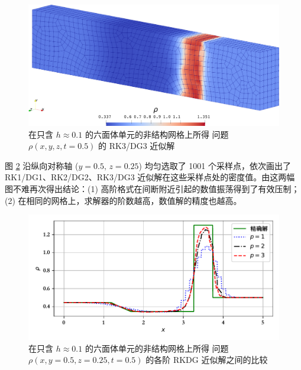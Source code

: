 \begin{figure}[h!]
\begin{centering}
\includegraphics[width=1\textwidth]{../mdpi/figures/shock_tubes/lax/contour}
\par\end{centering}
\caption{\label{fig:lax_hexa}在只含 $h\approx0.1$ 的六面体单元的非结构网格上所得 问题
$\rho(x,y,z,t=0.5)$ 的 RK3/DG3 近似解}
\end{figure}

图 \ref{fig:lax_hexa_p_vary} 沿纵向对称轴 ($y=0.5,\,z=0.25$) 均匀选取了 1001
个采样点，依次画出了 RK1/DG1、RK2/DG2、RK3/DG3 近似解在这些采样点处的密度值。由这两幅图不难再次得出结论：(1)
高阶格式在间断附近引起的数值振荡得到了有效压制；(2) 在相同的网格上，求解器的阶数越高，数值解的精度也越高。

\begin{figure}[h!]
\begin{centering}
\includegraphics[width=1\textwidth,height=0.3\textheight]{figures/shock_tubes/lax/result}
\par\end{centering}
\caption{\label{fig:lax_hexa_p_vary}在只含 $h\approx0.1$ 的六面体单元的非结构网格上所得 问题
$\rho(x,y=0.5,z=0.25,t=0.5)$ 的各阶 RKDG 近似解之间的比较}
\end{figure}

